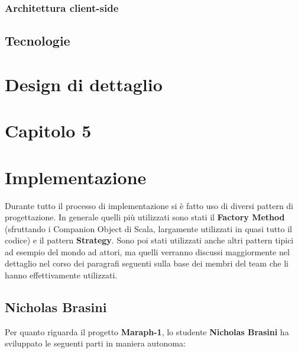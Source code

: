             \subsubsection{Architettura client-side}\label{subsub:architecture:client}
        \subsection{Tecnologie}\label{subsec:technologies}
        
        \clearpage
        
    \section{Design di dettaglio}\label{sec:design:details}
    
    \clearpage
    
 \section*{\Huge {\textbf Capitolo 5}\label{chapter5}}
 
     \section{Implementazione}\label{sec:implementation}

     Durante tutto il processo di implementazione si è fatto uso di diversi pattern di progettazione. In generale quelli più utilizzati sono stati il \textbf{Factory Method} (sfruttando i Companion Object di Scala, largamente utilizzati in quasi tutto il codice) e il pattern \textbf{Strategy}. Sono poi stati utilizzati anche altri pattern tipici ad esempio del mondo ad attori, ma quelli verranno discussi maggiormente nel dettaglio nel corso dei paragrafi seguenti sulla base dei membri del team che li hanno effettivamente utilizzati.
     
        \subsection{Nicholas Brasini}\label{subsec:brasini}
        Per quanto riguarda il progetto \textbf{Maraph-1}, lo studente \textbf{Nicholas Brasini} ha sviluppato le seguenti parti in maniera autonoma:
        
